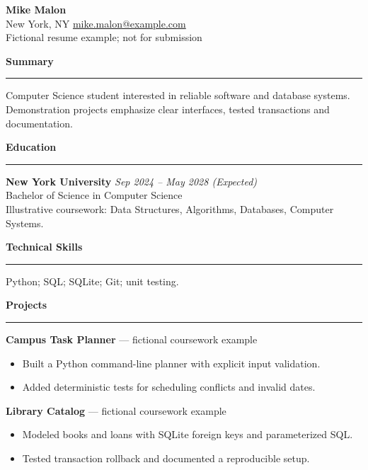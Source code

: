 \documentclass[11pt,letterpaper]{article}
\newenvironment{rSection}[1]{\par\medskip\textbf{\large #1}\par\smallskip\hrule\smallskip}{\par}
\begin{document}
\begin{center}
  {\LARGE\bfseries Mike Malon}\\[4pt]
  New York, NY \quad \href{mailto:mike.malon@example.com}{mike.malon@example.com}\\[3pt]
  {\small Fictional resume example; not for submission}
\end{center}

\begin{rSection}{Summary}
Computer Science student interested in reliable software and database systems.
Demonstration projects emphasize clear interfaces, tested transactions and documentation.
\end{rSection}

\begin{rSection}{Education}
{\bf New York University} \hfill {\em Sep 2024 -- May 2028 (Expected)}\\
Bachelor of Science in Computer Science\\
Illustrative coursework: Data Structures, Algorithms, Databases, Computer Systems.
\end{rSection}

\begin{rSection}{Technical Skills}
Python; SQL; SQLite; Git; unit testing.
\end{rSection}

\begin{rSection}{Projects}
\textbf{Campus Task Planner} --- fictional coursework example
\begin{itemize}
  \item Built a Python command-line planner with explicit input validation.
  \item Added deterministic tests for scheduling conflicts and invalid dates.
\end{itemize}
\textbf{Library Catalog} --- fictional coursework example
\begin{itemize}
  \item Modeled books and loans with SQLite foreign keys and parameterized SQL.
  \item Tested transaction rollback and documented a reproducible setup.
\end{itemize}
\end{rSection}
\end{document}

